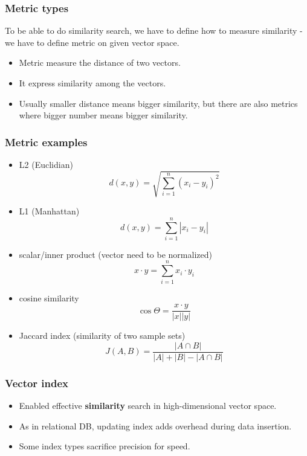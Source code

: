 \documentclass[10pt,utf8]{beamer}
\begin{document}
\begin{frame}
    \frametitle{Metric types}
    To be able to do similarity search, we have to define how to measure similarity - we have to define metric on given vector space.
    
    \vspace{0.1cm}
    
    \begin{itemize}
        \item Metric measure the distance of two vectors.
        \item It express similarity among the vectors.
        \item Usually smaller distance means bigger similarity, but there are also metrics where bigger number means bigger similarity.
    \end{itemize}
\end{frame}

\begin{frame}
    \frametitle{Metric examples}
    \begin{itemize}
        \item L2 (Euclidian) $$d(x,y) = \sqrt{\sum_{i=1}^{n} (x_i - y_i)^2}$$
        \item L1 (Manhattan) $$d(x,y) = \sum_{i=1}^{n} |x_i - y_i|$$
        \item scalar/inner product (vector need to be normalized) $$x \cdot y = \sum_{i=1}^{n} x_i \cdot y_i$$
        \item cosine similarity $$\cos{\Theta} = \frac{x \cdot y}{|x||y|}$$
        \item Jaccard index (similarity of two sample sets) $$J(A, B) = \frac{|A \cap B|}{|A| + |B| - |A \cap B|}$$
    \end{itemize}
\end{frame}

\begin{frame}
    \frametitle{Vector index}
    \begin{itemize}
        \item Enabled effective \textbf{similarity} search in high-dimensional vector space.
        \item As in relational DB, updating index adds overhead during data insertion.
        \item Some index types sacrifice precision for speed.
    \end{itemize}
\end{frame}
\end{document}
